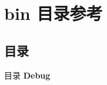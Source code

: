 \section{bin 目录参考}
\label{dir_2ea30aa2956a8db99dd22aa5e597f384}
\subsection*{目录}
\begin{DoxyCompactItemize}
\item 
目录 \textbf{ Debug}
\end{DoxyCompactItemize}
